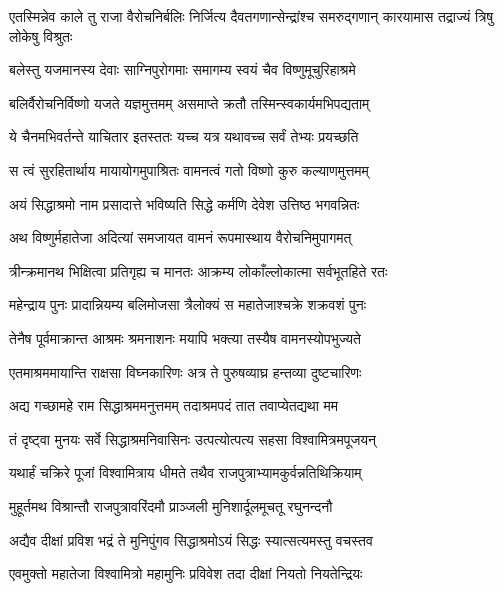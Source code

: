 \threelineshloka
{एतस्मिन्नेव काले तु राजा वैरोचनिर्बलिः}
{निर्जित्य दैवतगणान्सेन्द्रांश्च समरुद्गणान्}
{कारयामास तद्राज्यं त्रिषु लोकेषु विश्रुतः} %

\twolineshloka
{बलेस्तु यजमानस्य देवाः साग्निपुरोगमाः}
{समागम्य स्वयं चैव विष्णुमूचुरिहाश्रमे} %

\twolineshloka
{बलिर्वैरोचनिर्विष्णो यजते यज्ञमुत्तमम्}
{असमाप्ते क्रतौ तस्मिन्स्वकार्यमभिपद्यताम्} %

\twolineshloka
{ये चैनमभिवर्तन्ते याचितार इतस्ततः}
{यच्च यत्र यथावच्च सर्वं तेभ्यः प्रयच्छति} %

\twolineshloka
{स त्वं सुरहितार्थाय मायायोगमुपाश्रितः}
{वामनत्वं गतो विष्णो कुरु कल्याणमुत्तमम्} %

\twolineshloka
{अयं सिद्धाश्रमो नाम प्रसादात्ते भविष्यति}
{सिद्धे कर्मणि देवेश उत्तिष्ठ भगवन्नितः} %

\twolineshloka
{अथ विष्णुर्महातेजा अदित्यां समजायत}
{वामनं रूपमास्थाय वैरोचनिमुपागमत्} %

\twolineshloka
{त्रीन्क्रमानथ भिक्षित्वा प्रतिगृह्य च मानतः}
{आक्रम्य लोकाँल्लोकात्मा सर्वभूतहिते रतः} %

\twolineshloka
{महेन्द्राय पुनः प्रादान्नियम्य बलिमोजसा}
{त्रैलोक्यं स महातेजाश्चक्रे शक्रवशं पुनः} %

\twolineshloka
{तेनैष पूर्वमाक्रान्त आश्रमः श्रमनाशनः}
{मयापि भक्त्या तस्यैष वामनस्योपभुज्यते} %

\twolineshloka
{एतमाश्रममायान्ति राक्षसा विघ्नकारिणः}
{अत्र ते पुरुषव्याघ्र हन्तव्या दुष्टचारिणः} %

\twolineshloka
{अद्य गच्छामहे राम सिद्धाश्रममनुत्तमम्}
{तदाश्रमपदं तात तवाप्येतद्यथा मम} %

\twolineshloka
{तं दृष्ट्वा मुनयः सर्वे सिद्धाश्रमनिवासिनः}
{उत्पत्योत्पत्य सहसा विश्वामित्रमपूजयन्} %

\twolineshloka
{यथार्हं चक्रिरे पूजां विश्वामित्राय धीमते}
{तथैव राजपुत्राभ्यामकुर्वन्नतिथिक्रियाम्} %

\twolineshloka
{मुहूर्तमथ विश्रान्तौ राजपुत्रावरिंदमौ}
{प्राञ्जली मुनिशार्दूलमूचतू रघुनन्दनौ} %

\twolineshloka
{अद्यैव दीक्षां प्रविश भद्रं ते मुनिपुंगव}
{सिद्धाश्रमोऽयं सिद्धः स्यात्सत्यमस्तु वचस्तव} %

\twolineshloka
{एवमुक्तो महातेजा विश्वामित्रो महामुनिः}
{प्रविवेश तदा दीक्षां नियतो नियतेन्द्रियः} %

